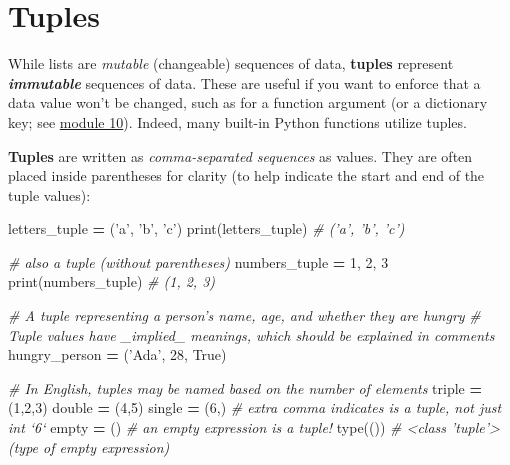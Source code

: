 \documentclass[]{book}
\newenvironment{Shaded}{\begin{snugshade}}{\end{snugshade}}
\newcommand{\DecValTok}[1]{\textcolor[rgb]{0.00,0.00,0.81}{#1}}
\newcommand{\StringTok}[1]{\textcolor[rgb]{0.31,0.60,0.02}{#1}}
\newcommand{\CommentTok}[1]{\textcolor[rgb]{0.56,0.35,0.01}{\textit{#1}}}
\newcommand{\VariableTok}[1]{\textcolor[rgb]{0.00,0.00,0.00}{#1}}
\newcommand{\OperatorTok}[1]{\textcolor[rgb]{0.81,0.36,0.00}{\textbf{#1}}}
\newcommand{\BuiltInTok}[1]{#1}
\newcommand{\NormalTok}[1]{#1}
\begin{document}
\hypertarget{tuples}{\section{Tuples}\label{tuples}}

While lists are \emph{mutable} (changeable) sequences of data,
\textbf{tuples} represent \textbf{\emph{immutable}} sequences of data.
These are useful if you want to enforce that a data value won't be
changed, such as for a function argument (or a dictionary key; see
\href{../../module10-dictionaries}{module 10}). Indeed, many built-in
Python functions utilize tuples.

\textbf{Tuples} are written as \emph{comma-separated sequences} as
values. They are often placed inside parentheses for clarity (to help
indicate the start and end of the tuple values):

\begin{Shaded}
\begin{Highlighting}[]
\NormalTok{letters_tuple }\OperatorTok{=}\NormalTok{ (}\StringTok{'a'}\NormalTok{, }\StringTok{'b'}\NormalTok{, }\StringTok{'c'}\NormalTok{)}
\BuiltInTok{print}\NormalTok{(letters_tuple)  }\CommentTok{# ('a', 'b', 'c')}

\CommentTok{# also a tuple (without parentheses)}
\NormalTok{numbers_tuple }\OperatorTok{=} \DecValTok{1}\NormalTok{, }\DecValTok{2}\NormalTok{, }\DecValTok{3}
\BuiltInTok{print}\NormalTok{(numbers_tuple)  }\CommentTok{# (1, 2, 3)}

\CommentTok{# A tuple representing a person's name, age, and whether they are hungry}
\CommentTok{# Tuple values have _implied_ meanings, which should be explained in comments}
\NormalTok{hungry_person }\OperatorTok{=}\NormalTok{ (}\StringTok{'Ada'}\NormalTok{, }\DecValTok{28}\NormalTok{, }\VariableTok{True}\NormalTok{)}

\CommentTok{# In English, tuples may be named based on the number of elements}
\NormalTok{triple }\OperatorTok{=}\NormalTok{ (}\DecValTok{1}\NormalTok{,}\DecValTok{2}\NormalTok{,}\DecValTok{3}\NormalTok{)}
\NormalTok{double }\OperatorTok{=}\NormalTok{ (}\DecValTok{4}\NormalTok{,}\DecValTok{5}\NormalTok{)}
\NormalTok{single }\OperatorTok{=}\NormalTok{ (}\DecValTok{6}\NormalTok{,)  }\CommentTok{# extra comma indicates is a tuple, not just int `6`}
\NormalTok{empty }\OperatorTok{=}\NormalTok{ ()  }\CommentTok{# an empty expression is a tuple!}
\BuiltInTok{type}\NormalTok{(())  }\CommentTok{# <class 'tuple'> (type of empty expression)}
\end{Highlighting}
\end{Shaded}
\end{document}
